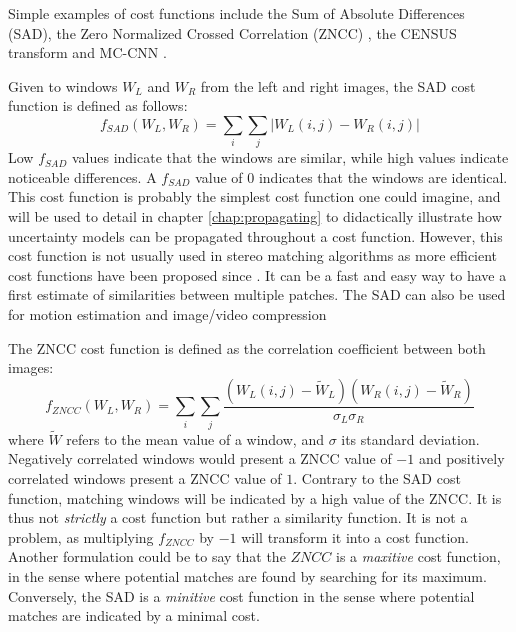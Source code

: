 \begin{example}\label{ex:cost_functions}
	Simple examples of cost functions include the Sum of Absolute Differences (SAD), the Zero Normalized Crossed Correlation (ZNCC)  \cite{hannah_computer_1994}, the CENSUS transform \cite{zabih_non-parametric_1994} and MC-CNN \cite{zbontar_stereo_2016}.
	
	Given to windows $W_L$ and $W_R$ from the left and right images, the SAD cost function is defined as follows:
	\begin{equation}
		f_{SAD}(W_L, W_R)  = \sum_i\sum_j | W_L(i,j) - W_R(i,j) |
	\end{equation}
	Low $f_{SAD}$ values indicate that the windows are similar, while high values indicate noticeable differences. A $f_{SAD}$ value of $0$ indicates that the windows are identical. This cost function is probably the simplest cost function one could imagine, and will be used to detail in chapter \ref{chap:propagating} to didactically illustrate how uncertainty models can be propagated throughout a cost function. However, this cost function is not usually used in stereo matching algorithms as more efficient cost functions have been proposed since . It can be a fast and easy way to have a first estimate of similarities between multiple patches. The SAD can also be used for motion estimation and image/video compression \cite{richardson_h264_2006}
	
	The ZNCC cost function is defined as the correlation coefficient between both images:
	\begin{equation}
		f_{ZNCC}(W_L, W_R)  = \sum_i\sum_j \frac{(W_L(i,j)  - \tilde{W}_L) (W_R(i,j)  - \tilde{W}_R) }{\sigma_L\sigma_R}
	\end{equation}
	where $\tilde{W}$ refers to the mean value of a window, and $\sigma$ its standard deviation. Negatively correlated windows would present a ZNCC value of $-1$ and positively correlated windows present a ZNCC value of $1$. Contrary to the SAD cost function, matching windows will be indicated by a high value of the ZNCC. It is thus not \textit{strictly} a cost function but rather a similarity function. It is not a problem, as multiplying $f_{ZNCC}$ by $-1$ will transform it into a cost function. Another formulation could be to say that the $ZNCC$ is a \textit{maxitive} cost function, in the sense where potential matches are found by searching for its maximum. Conversely, the SAD is a \textit{minitive} cost function in the sense where potential matches are indicated by a minimal cost.
	

\end{example}
